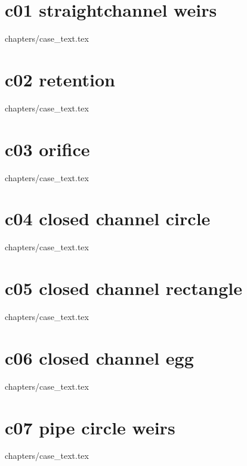 %
%
\chapter{c01 straightchannel weirs}
\graphicspath{{../c01_straightchannel_weirs/doc/}}
{chapters/case_text.tex}
%
\chapter{c02 retention}
\graphicspath{{../c02_retention/doc/}}
{chapters/case_text.tex}
%
\chapter{c03 orifice}
\graphicspath{{../c03_orifice/doc/}}
{chapters/case_text.tex}
%
\chapter{c04 closed channel circle}
\graphicspath{{../c04_closed_channel_circle/doc/}}
{chapters/case_text.tex}
%
\chapter{c05 closed channel rectangle}
\graphicspath{{../c05_closed_channel_rectangle/doc/}}
{chapters/case_text.tex}
%
\chapter{c06 closed channel egg}
\graphicspath{{../c06_closed_channel_egg/doc/}}
{chapters/case_text.tex}
%
\chapter{c07 pipe circle weirs}
\graphicspath{{../c07_pipe_circle_weirs/doc/}}
{chapters/case_text.tex}
%
